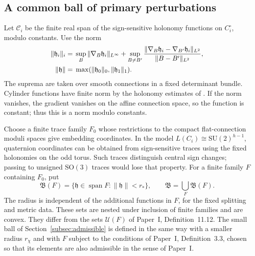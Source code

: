\documentclass[11pt]{amsart}
\theoremstyle{definition}
\theoremstyle{remark}
\theoremstyle{plain}
\numberwithin{equation}{section}
\newcommand{\SO}{\mathrm{SO}}
\newcommand{\SU}{\mathrm{SU}}
\begin{document}
\subsection{A common ball of primary perturbations}
Let $\mathcal C_i$ be the finite real span of the
sign-sensitive holonomy functions on $C_i^\circ$,
modulo constants. Use the norm
\begin{align}
 \|\mathfrak h_i\|_i={}&\sup_B\|\nabla_B\mathfrak h_i\|_{L^\infty}
  +\sup_{B\ne B'}
   \frac{\|\nabla_B\mathfrak h_i-\nabla_{B'}\mathfrak h_i\|_{L^2}}
        {\|B-B'\|_{L^2}},\label{eq:primary-norm}\\
 \|\mathfrak h\|={}&\max(\|\mathfrak h_0\|_0,\|\mathfrak h_1\|_1).\notag
\end{align}
The suprema are taken over smooth connections in a
fixed determinant bundle. Cylinder functions have
finite norm by the holonomy estimates of
\cite[Proposition~6.1]{DFL}. If the norm vanishes,
the gradient vanishes on the affine connection
space, so the function is constant; thus this is
a norm modulo constants.

Choose a finite trace family $F_0$ whose restrictions
to the compact flat-connection moduli spaces give
embedding coordinates. In the model
$L(C_i)\cong\SU(2)^{h-1}$, quaternion coordinates
can be obtained from sign-sensitive traces using
the fixed holonomies on the odd torus. Such traces
distinguish central sign changes; passing to
unsigned $\SO(3)$ traces would lose that property.
For a finite family $F$ containing $F_0$, put
\[
 \mathfrak B(F)=\{\mathfrak h\in\operatorname{span}F:\|\mathfrak h\|<r_*\},
 \qquad \mathfrak B=\bigcup_F\mathfrak B(F).
\]
The radius is independent of the additional
functions in $F$, for the fixed splitting and
metric data. These sets are nested under
inclusion of finite families and are convex.
They differ from the sets $\mathcal U(F)$ of Paper~I,
Definition~11.12. The small ball of
Section~\ref{subsec:admissible} is defined in the same way with a smaller radius $r_\chi$ and with $F$ subject to the conditions of Paper~I, Definition~3.3, chosen so that its
elements are also admissible in the sense of Paper~I.
\end{document}
